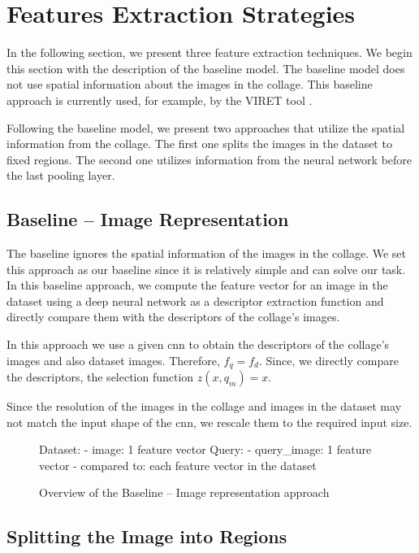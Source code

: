 \section{Features Extraction Strategies}

In the following section, we present three feature extraction techniques. We begin this section with the description of the baseline model. The baseline model does not use spatial information about the images in the collage. This baseline approach is currently used, for example, by the VIRET tool \citep{kovalvcik2020viret}. 

Following the baseline model, we present two approaches that utilize the spatial information from the collage. The first one splits the images in the dataset to fixed regions. The second one utilizes information from the neural network before the last pooling layer.

\subsection{Baseline -- Image Representation}

The baseline ignores the spatial information of the images in the collage. We set this approach as our baseline since it is relatively simple and can solve our task. In this baseline approach, we compute the feature vector for an image in the dataset using a deep neural network as a descriptor extraction function and directly compare them with the descriptors of the collage's images.

In this approach we use a given \acrshort{cnn} to obtain the descriptors of the collage's images and also dataset images. Therefore, $f_q = f_d$. Since, we directly compare the descriptors, the selection function $z(x, q_m) = x$.

Since the resolution of the images in the collage and images in the dataset may not match the input shape of the \acrshort{cnn}, we rescale them to the required input size.

\begin{figure}
\centering
\begin{boxedverbatim}
Dataset:
    - image: 1 feature vector
Query:
    - query_image: 1 feature vector
    - compared to: each feature vector in the dataset
\end{boxedverbatim}
\caption{Overview of the Baseline -- Image representation approach}
\end{figure}

\subsection{Splitting the Image into Regions}

